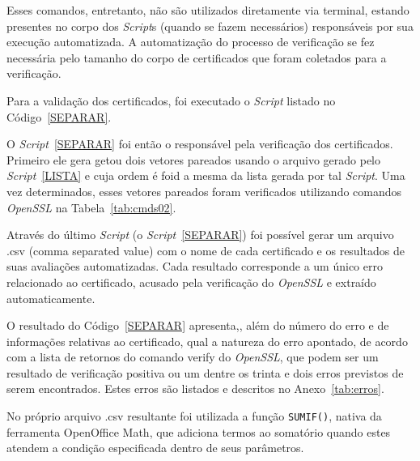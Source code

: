 		Esses comandos, entretanto, não são utilizados diretamente via terminal, estando presentes no corpo dos \textit{Script}s (quando se fazem necessários) responsáveis por sua execução automatizada. A automatização do processo de verificação se fez necessária pelo tamanho do corpo de certificados que foram coletados para a verificação.

	    Para a validação dos certificados, foi executado o \textit{Script} listado no Código~\ref{SEPARAR}.

	    
	    O \textit{Script}~\ref{SEPARAR} foi então o responsável pela verificação dos certificados. Primeiro ele gera  getou dois vetores pareados usando o arquivo gerado pelo \textit{Script}~\ref{LISTA} e cuja ordem é  foid a mesma da lista gerada por tal \textit{Script}. Uma vez determinados, esses vetores pareados foram verificados utilizando comandos \textit{OpenSSL} na Tabela~\ref{tab:cmds02}.

	    Através do último \textit{Script} (o \textit{Script}~\ref{SEPARAR}) foi possível gerar um arquivo .csv (comma separated value) com o nome de cada certificado e os resultados de suas avaliações automatizadas. Cada resultado corresponde a um único erro relacionado ao certificado, acusado pela verificação do \textit{OpenSSL} e extraído automaticamente.

    	O resultado do Código~\ref{SEPARAR} apresenta,, além do número do erro e de informações relativas ao certificado, qual a natureza do erro apontado, de acordo com a lista de retornos do comando verify do \textit{OpenSSL}, que podem ser um resultado de verificação positiva ou um dentre os trinta e dois erros previstos de serem encontrados. Estes erros são listados e descritos no Anexo~\ref{tab:erros}.

    	No próprio arquivo .csv resultante foi utilizada a função \texttt{SUMIF()}, nativa da ferramenta OpenOffice Math, que adiciona termos ao somatório quando estes atendem a condição especificada dentro de seus parâmetros.